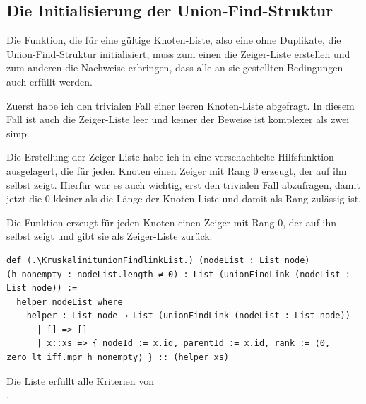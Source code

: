 \subsection{Die Initialisierung der Union-Find-Struktur}
Die Funktion, die für eine gültige Knoten-Liste, also eine ohne Duplikate, die Union-Find-Struktur initialisiert, muss zum einen die Zeiger-Liste erstellen
und zum anderen die Nachweise erbringen, dass alle an sie gestellten Bedingungen auch erfüllt werden.

Zuerst habe ich den trivialen Fall einer leeren Knoten-Liste abgefragt.
In diesem Fall ist auch die Zeiger-Liste leer und keiner der Beweise ist komplexer als zwei simp.

Die Erstellung der Zeiger-Liste habe ich in eine verschachtelte Hilfsfunktion ausgelagert,
die für jeden Knoten einen Zeiger mit Rang 0 erzeugt, der auf ihn selbst zeigt.
Hierfür war es auch wichtig, erst den trivialen Fall abzufragen, damit jetzt die 0 kleiner als die Länge der Knoten-Liste und damit als Rang zulässig ist.

\begin{definition}[\KruskalinitunionFindlinkList]
  Die Funktion erzeugt für jeden Knoten einen Zeiger mit Rang 0, der auf ihn selbst zeigt und gibt sie als Zeiger-Liste zurück.
\end{definition}
\begin{lstlisting}
def (.\KruskalinitunionFindlinkList.) (nodeList : List node) (h_nonempty : nodeList.length ≠ 0) : List (unionFindLink (nodeList : List node)) :=
  helper nodeList where
    helper : List node → List (unionFindLink (nodeList : List node))
      | [] => []
      | x::xs => { nodeId := x.id, parentId := x.id, rank := ⟨0, zero_lt_iff.mpr h_nonempty⟩ } :: (helper xs)
\end{lstlisting}

\begin{theorem}
  Die Liste \KruskalinitunionFindlinkList erfüllt alle Kriterien von \\\KruskalunionFind.
\end{theorem}

